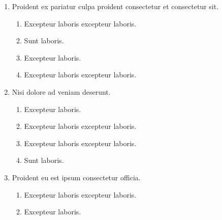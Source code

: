 \documentclass[a4paper,12pt]{article}
\begin{document}
\begin{enumerate}[label=\textbf{\arabic*.}]
\begin{multicols}{2}
\begin{enumerate}
		\item  Excepteur laboris excepteur laboris.
    
		\item  Sunt laboris.
    
		\item  Excepteur laboris excepteur laboris.
  
	\end{enumerate}

\end{multicols}
\item Proident ex pariatur culpa proident consectetur et consectetur sit.
\begin{multicols}{2}
	\begin{enumerate}
		\item  Excepteur laboris excepteur laboris.
  
		\item  Sunt laboris.
    
		\item  Excepteur laboris.
    
		\item  Excepteur laboris excepteur laboris.
    
	\end{enumerate}

\end{multicols}
\item Nisi dolore ad veniam deserunt.
\begin{multicols}{2}
	\begin{enumerate}
		\item  Excepteur laboris.
    
		\item  Excepteur laboris excepteur laboris.
    
		\item  Excepteur laboris excepteur laboris.
  
		\item  Sunt laboris.
    
	\end{enumerate}

\end{multicols}
\item Proident eu est ipsum consectetur officia.
\begin{multicols}{2}
	\begin{enumerate}
		\item  Excepteur laboris excepteur laboris.
  
		\item  Excepteur laboris.
    

\end{enumerate}
\end{multicols}
\end{enumerate}
\end{document}
